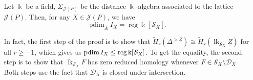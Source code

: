 \documentclass[a4paper,leqno]{amsart}
\begin{document}


\begin{thm}\label{thm:pdim=reg}
Let $\Bbbk$ be a field, $\Sigma_{\mathcal{J}(P)}$ be the distance $\Bbbk$-algebra associated to the lattice $\mathcal{J}(P)$. Then, for any $X\in\mathcal{J}(P)$, we have
\[
\operatorname{pdim}_A I_X=\operatorname{reg}\Bbbk[\mathcal S_X].
\]
\end{thm}

In fact, the first step of the proof is to show that $\widetilde H_r(\Delta^{>\underline{Z}})\cong\widetilde H_r(\operatorname{lk}_{\mathcal S_X}\underline{Z})$ for all $r\ge -1$, which gives us $\operatorname{pdim} I_X\le \operatorname{reg} \Bbbk[\mathcal{S}_X]$. To get the equality, the second step is to show that $\operatorname{lk}_{\mathcal S_X}F$ has zero reduced homology whenever $F\in\mathcal S_X\setminus\mathcal D_X$. Both steps use the fact that $\mathcal D_X$ is closed under intersection.
\end{document}
